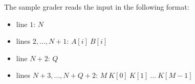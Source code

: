 The sample grader reads the input in the following format:
\begin{itemize}
\item line $1$: $N$
\item lines $2, \ldots,N + 1$: $A[i]\ B[i]$
\item line $N + 2$: $Q$
\item lines $N + 3, \ldots, N + Q + 2$: $M\ K[0]\ K[1]\ \ldots\ K[M - 1]$
\end{itemize}